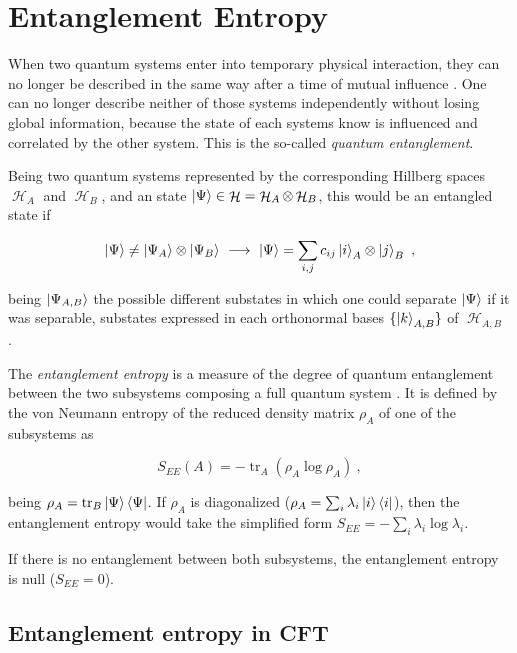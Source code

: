 \documentclass[lettersize,journal]{IEEEtran}
\providecommand{\eq}[2]{
    \begin{equation}
        #2
    \label{eq:#1}
    \end{equation}
}
\DeclareMathOperator{\calH}{\mathcal{H}}
\DeclareMathOperator{\tr}{tr}
\begin{document}
\section{Entanglement Entropy} \label{s:EE}

When two quantum systems enter into temporary physical interaction, they can no longer be described in the same way after a time of mutual influence \cite{schrodinger_discussion_1935}. One can no longer describe neither of those systems independently without losing global information, because the state of each systems know is influenced and correlated by the other system. This is the so-called \textit{quantum entanglement}.

Being two quantum systems represented by the corresponding Hillberg spaces $\calH_A$ and $\calH_B$, and an state $\ket{\Psi} \in \calH = \calH_A \otimes \calH_B$, this would be an entangled state if
\eq{entanglement}{
    \ket{\Psi} \neq \ket{\Psi_A} \otimes \ket{\Psi_B} \ \longrightarrow \ \ket{\Psi} = \sum_{i,j} c_{ij} \ket{i}_A \otimes \ket{j}_B \ ,
}
being $\ket{\Psi_{A,B}}$ the possible different substates in which one could separate $\ket{\Psi}$ if it was separable, substates expressed in each orthonormal bases $\{ \ket{k}_{A,B} \}$ of $\calH_{A,B}$ \cite{}.

The \textit{entanglement entropy} is a measure of the degree of quantum entanglement between the two subsystems composing a full quantum system \cite{nishioka_entanglement_2018}. It is defined by the von
Neumann entropy of the reduced density matrix $\rho_A$ of one of the subsystems as
\eq{EE}{
    S_{EE}(A) = - \tr_A ( \rho_A \log \rho_A ) \ ,
}
being $\rho_A = \tr_B \ket{\Psi}\bra{\Psi}$. If $\rho_A$ is diagonalized ($\rho_A = \sum_i \lambda_i \ket{i}\bra{i}$), then the entanglement entropy would take the simplified form $S_{EE} = - \sum_i \lambda_i \log \lambda_i$.

If there is no entanglement between both subsystems, the entanglement entropy is null ($S_{EE} = 0$).


\subsection{Entanglement entropy in CFT} \label{ss:EE_CFT}
\end{document}
